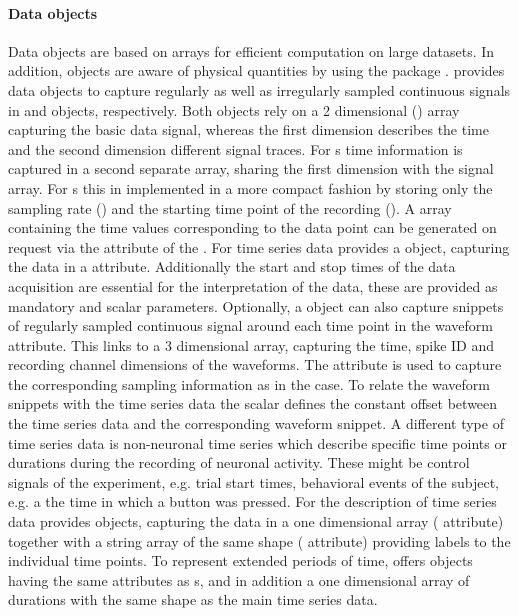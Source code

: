 \paragraph{Data objects}
Data objects are based on  arrays \citep{Walt_2011} for efficient computation on large datasets. In addition,  objects are aware of physical quantities by using the  package \citep{Dale_}.
 provides data objects to capture regularly as well as irregularly sampled continuous signals in  and  objects, respectively. Both objects rely on a 2 dimensional  () array capturing the basic data signal, whereas the first dimension describes the time and the second dimension different signal traces. For s time information is captured in a second separate  array, sharing the first dimension with the signal array. For s this in implemented in a more compact fashion by storing only the sampling rate () and the starting time point of the recording (). A  array containing the time values corresponding to the data point can be generated on request via the  attribute of the .
For time series data  provides a  object, capturing the data in a  attribute. Additionally the start and stop times of the data acquisition are essential for the interpretation of the data, these are provided as mandatory  and  scalar  parameters. Optionally, a  object can also capture snippets of regularly sampled continuous signal around each time point in the waveform attribute. This links to a 3 dimensional array, capturing the time, spike ID and recording channel dimensions of the waveforms. The  attribute  is used to capture the corresponding sampling information as in the  case. To relate the waveform snippets with the time series data the  scalar  defines the constant offset between the time series data and the corresponding waveform snippet.
A different type of time series data is non-neuronal time series which describe specific time points or durations during the recording of neuronal activity. These might be control signals of the experiment, e.g. trial start times, behavioral events of the subject, e.g. a the time in which a button was pressed. For the description of time series data  provides  objects, capturing the data in a one dimensional  array ( attribute) together with a string array of the same shape ( attribute) providing labels to the individual time points. To represent extended periods of time,  offers  objects having the same attributes as s, and in addition a one dimensional  array of durations with the same shape as the main time series data.

